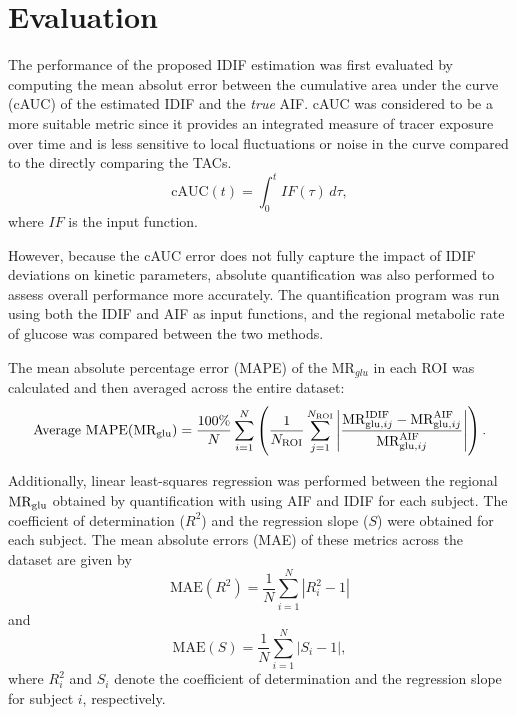 \section{Evaluation}
The performance of the proposed IDIF estimation was first evaluated by computing the mean absolut error between the cumulative area under the curve (cAUC) of the estimated IDIF and the \textit{true} AIF. cAUC was considered to be a more suitable metric since it provides an integrated measure of tracer exposure over time and is less sensitive to local fluctuations or noise in the curve compared to the directly comparing the TACs.
\begin{equation}
	\textrm{cAUC}(t) =  \int_{0}^{t} IF(\tau) \, d\tau,
\end{equation}
where \(IF\) is the input function.

However, because the cAUC error does not fully capture the impact of IDIF deviations on kinetic parameters, absolute quantification was also performed to assess overall performance more accurately. The quantification program was run using both the IDIF and AIF as input functions, and the regional metabolic rate of glucose was compared between the two methods.

The mean absolute percentage error (MAPE) of the \(\textrm{MR}_{glu}\) in each ROI was calculated and then averaged across the entire dataset:
\begin{equation}
	\text{Average MAPE}(\text{MR}_{\text{glu}})= \frac{100\%}{N} \sum_{i=1}^{N} \left( \frac{1}{N_{\text{ROI}}} \sum_{j=1}^{N_{\text{ROI}}} \left| \frac{\textrm{MR}_{\textrm{glu},ij}^{\textrm{IDIF}} - \textrm{MR}_{\textrm{glu},ij}^{\textrm{AIF}}}{\textrm{MR}_{\textrm{glu},ij}^{\textrm{AIF}}} \right| \right).
\end{equation}

Additionally, linear least-squares regression was performed between the regional \(\text{MR}_{\text{glu}}\) obtained by quantification with using AIF and IDIF for each subject. The coefficient of determination (\(R^2\)) and the regression slope (\(S\)) were obtained for each subject. The mean absolute errors (MAE) of these metrics across the dataset are given by
\begin{equation}
	\text{MAE}(R^2) = \frac{1}{N} \sum_{i=1}^{N} \left| R^2_i - 1 \right|
\end{equation}
and
\begin{equation}
	\text{MAE}(S) = \frac{1}{N} \sum_{i=1}^{N} \left| S_i - 1 \right|,
\end{equation}
where \(R^2_i\) and \(S_i\) denote the coefficient of determination and the regression slope for subject \(i\), respectively.

